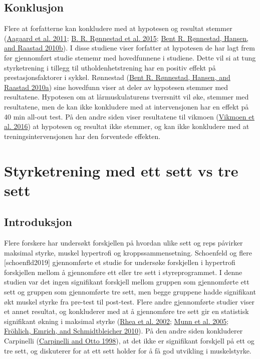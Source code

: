 \documentclass[
]{book}
\begin{document}
\hypertarget{konklusjon}{%
\section{Konklusjon}\label{konklusjon}}

Flere at forfatterne kan konkludere med at hypotesen og resultat stemmer
(\protect\hyperlink{ref-aagaard2011}{Aagaard et al. 2011};
\protect\hyperlink{ref-ruxf8nnestad2015}{B. R. Rønnestad et al. 2015};
\protect\hyperlink{ref-ruxf8nnestad2010a}{Bent R. Rønnestad, Hansen, and
Raastad 2010b}). I disse studiene viser forfatter at hypotesen de har
lagt frem før gjennomført studie stememr med hovedfunnene i studiene.
Dette vil si at tung styrketrening i tillegg til utholdenhetstrening har
en positiv effekt på prestasjonsfaktorer i sykkel. Rønnestad
(\protect\hyperlink{ref-ruxf8nnestad2010b}{Bent R. Rønnestad, Hansen,
and Raastad 2010a}) sine hovedfunn viser at deler av hypotesen stemmer
med resultatene. Hypotesen om at lårmuskulaturens tverrsnitt vil øke,
stemmer med resultatene, men de kan ikke konkludere med at
intervensjonen har en effekt på 40 min all-out test. På den andre siden
viser resultatene til vikmoen
(\protect\hyperlink{ref-vikmoen2016}{Vikmoen et al. 2016}) at hypotesen
og resultat ikke stemmer, og kan ikke konkludere med at
treningsintervensjonen har den forventede effekten.

\hypertarget{styrketrening-med-ett-sett-vs-tre-sett}{%
\chapter{Styrketrening med ett sett vs tre
sett}\label{styrketrening-med-ett-sett-vs-tre-sett}}

\hypertarget{introduksjon-1}{%
\section{Introduksjon}\label{introduksjon-1}}

Flere forskere har undersøkt forskjellen på hvordan ulike sett og reps
påvirker maksimal styrke, muskel hypertrofi og kroppssammensetning.
Schoenfeld og flere {[}schoenfld2019{]} gjennomførte et studie for
undersøke forskjellen i hypertrofi forskjellen mellom å gjennomføre ett
eller tre sett i styreprogrammet. I denne studien var det ingen
signifikant forskjell mellom gruppen som gjennomførte ett sett og
gruppen som gjennomførte tre sett, men begge gruppene hadde signifikant
økt muskel styrke fra pre-test til post-test. Flere andre gjennomførte
studier viser et annet resultat, og konkluderer med at å gjennomføre tre
sett gir en statistisk signifikant økning i maksimal styrke
(\protect\hyperlink{ref-rhea2002}{Rhea et al. 2002};
\protect\hyperlink{ref-munn2005}{Munn et al. 2005};
\protect\hyperlink{ref-fruxf6hlich2010}{Fröhlich, Emrich, and
Schmidtbleicher 2010}). På den andre siden konkluderer Carpinelli
(\protect\hyperlink{ref-carpinelli1998}{Carpinelli and Otto 1998}), at
det ikke er signifikant forskjell på ett og tre sett, og diskuterer for
at ett sett holder for å få god utvikling i muskelstyrke.
\end{document}
